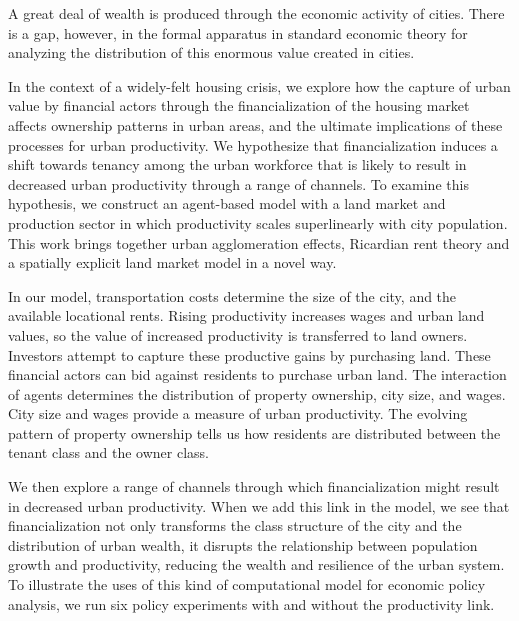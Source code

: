 



A great deal of wealth is produced through the economic activity of cities. There is a gap, however, in the formal apparatus in standard economic theory for analyzing the distribution of this enormous value created in cities. 

In the context of a widely-felt housing crisis, we explore how the capture of urban value by financial actors through the financialization of the housing market affects ownership patterns in urban areas, and the ultimate implications of these processes for urban productivity.  We hypothesize that financialization induces a shift towards tenancy among the urban workforce that is likely to result in decreased urban productivity through a range of channels. To examine this hypothesis, we construct an agent-based model with a land market and production sector in which productivity scales superlinearly with city population. This work brings together urban agglomeration effects, Ricardian rent theory and a spatially explicit land market model in a novel way. 

In our model, transportation costs determine the size of the city, and the available locational rents. Rising productivity increases wages and urban land values, so the value of increased productivity is transferred to land owners. Investors attempt to capture these productive gains by purchasing land. These financial actors can bid against residents to purchase urban land. The interaction of agents determines the distribution of property ownership,  city size, and wages. City size and wages provide a measure of urban productivity. The evolving pattern of property ownership tells us how residents are distributed between the tenant class and the owner class. 

We then explore a range of channels through which financialization might result in decreased urban productivity. When we add this link in the model, we see that financialization not only transforms the class structure of the city and the distribution of urban wealth, it disrupts the relationship between population growth and productivity, reducing the wealth and resilience of the urban system. To illustrate the uses of this kind of computational model for economic policy analysis, we run six policy experiments with and without the productivity link.  

